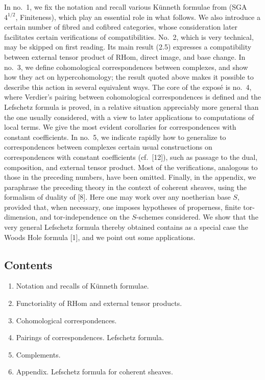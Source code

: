 \documentclass[11pt]{article}
\providecommand{\RHom}{\mathrm{RHom}}
\begin{document}
In no.~1, we fix the notation and recall various Künneth formulae from (SGA~$4^{1/2}$, Finiteness), which play an essential role in what follows. We also introduce a certain number of fibred and cofibred categories, whose consideration later facilitates certain verifications of compatibilities. No.~2, which is very technical, may be skipped on first reading. Its main result (2.5) expresses a compatibility between external tensor product of $\RHom$, direct image, and base change. In no.~3, we define cohomological correspondences between complexes, and show how they act on hypercohomology; the result quoted above makes it possible to describe this action in several equivalent ways. The core of the exposé is no.~4, where Verdier's pairing between cohomological correspondences is defined and the Lefschetz formula is proved, in a relative situation appreciably more general than the one usually considered, with a view to later applications to computations of local terms. We give the most evident corollaries for correspondences with constant coefficients. In no.~5, we indicate rapidly how to generalize to correspondences between complexes certain usual constructions on correspondences with constant coefficients (cf.~[12]), such as passage to the dual, composition, and external tensor product. Most of the verifications, analogous to those in the preceding numbers, have been omitted. Finally, in the appendix, we paraphrase the preceding theory in the context of coherent sheaves, using the formalism of duality of [8]. Here one may work over any noetherian base $S$, provided that, when necessary, one imposes hypotheses of properness, finite tor-dimension, and tor-independence on the $S$-schemes considered. We show that the very general Lefschetz formula thereby obtained contains as a special case the Woods Hole formula [1], and we point out some applications.

\subsection*{Contents}
\begin{enumerate}[label=\arabic*.]
\item Notation and recalls of Künneth formulae.
\item Functoriality of $\RHom$ and external tensor products.
\item Cohomological correspondences.
\item Pairings of correspondences. Lefschetz formula.
\item Complements.
\item Appendix. Lefschetz formula for coherent sheaves.
\end{enumerate}
\end{document}
